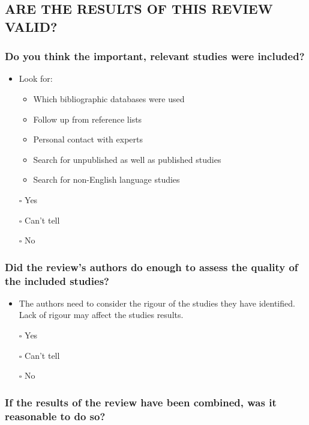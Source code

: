 \documentclass[
  doc, a4paper]{apa7}
\providecommand{\tightlist}{%
  \setlength{\itemsep}{0pt}\setlength{\parskip}{0pt}}
\begin{document}
\subsection{ARE THE RESULTS OF THIS REVIEW VALID?}\label{are-the-results-of-this-review-valid}

\subsubsection{Do you think the important, relevant studies were included?}\label{do-you-think-the-important-relevant-studies-were-included}

\begin{itemize}
\tightlist
\item
  Look for:

  \begin{itemize}
  \tightlist
  \item
    Which bibliographic databases were used
  \item
    Follow up from reference lists
  \item
    Personal contact with experts
  \item
    Search for unpublished as well as published studies
  \item
    Search for non-English language studies
  \end{itemize}
\item[$\square$]
  Yes
\item[$\square$]
  Can't tell
\item[$\square$]
  No
\end{itemize}

\subsubsection{Did the review's authors do enough to assess the quality of the included studies?}\label{did-the-reviews-authors-do-enough-to-assess-the-quality-of-the-included-studies}

\begin{itemize}
\tightlist
\item
  The authors need to consider the rigour of the studies they have identified. Lack of rigour may affect the studies results.
\item[$\square$]
  Yes
\item[$\square$]
  Can't tell
\item[$\square$]
  No
\end{itemize}

\subsubsection{If the results of the review have been combined, was it reasonable to do so?}\label{if-the-results-of-the-review-have-been-combined-was-it-reasonable-to-do-so}
\end{document}
